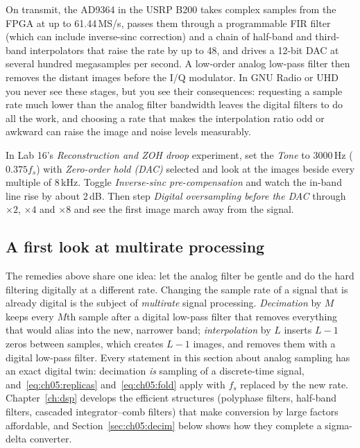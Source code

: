 \begin{inpractice}
On transmit, the AD9364 in the USRP B200 takes complex samples from the FPGA at up to
61.44\,MS/s, passes them through a programmable FIR filter (which can include inverse-sinc
correction) and a chain of half-band and third-band interpolators that raise the rate by up to
48, and drives a 12-bit DAC at several hundred megasamples per second. A low-order analog
low-pass filter then removes the distant images before the I/Q modulator. In GNU Radio or
UHD you never see these stages, but you see their consequences: requesting a sample rate
much lower than the analog filter bandwidth leaves the digital filters to do all the work,
and choosing a rate that makes the interpolation ratio odd or awkward can raise the image
and noise levels measurably.
\end{inpractice}

\begin{tryit}
In Lab 16's \emph{Reconstruction and ZOH droop} experiment, set the \emph{Tone} to 3000\,Hz
($0.375f_s$) with \emph{Zero-order hold (DAC)} selected and look at the images beside every
multiple of 8\,kHz. Toggle \emph{Inverse-sinc pre-compensation} and watch the in-band line rise by
about 2\,dB. Then step \emph{Digital oversampling before the DAC} through $\times2$, $\times4$ and
$\times8$ and see the first image march away from the signal.
\end{tryit}

\subsection{A first look at multirate processing}

The remedies above share one idea: let the analog filter be gentle and do the hard filtering
digitally at a different rate. Changing the sample rate of a signal that is already digital
is the subject of \emph{multirate} signal processing. \emph{Decimation} by $M$ keeps every
$M$th sample after a digital low-pass filter that removes everything that would alias into
the new, narrower band; \emph{interpolation} by $L$ inserts $L-1$ zeros between samples, which
creates $L-1$ images, and removes them with a digital low-pass filter. Every statement in
this section about analog sampling has an exact digital twin: decimation \emph{is} sampling
of a discrete-time signal, and~\eqref{eq:ch05:replicas} and~\eqref{eq:ch05:fold} apply with
$f_s$ replaced by the new rate. Chapter~\ref{ch:dsp} develops the efficient structures
(polyphase filters, half-band filters, cascaded integrator--comb filters) that make conversion
by large factors affordable, and Section~\ref{sec:ch05:decim} below shows how they complete a
sigma-delta converter.

